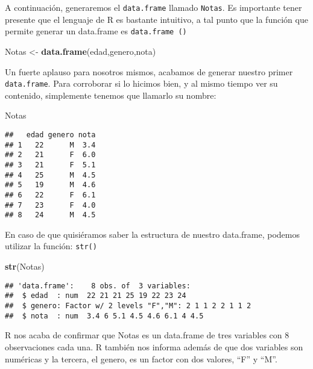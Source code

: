 \documentclass[]{book}
\newenvironment{Shaded}{\begin{snugshade}}{\end{snugshade}}
\newcommand{\KeywordTok}[1]{\textcolor[rgb]{0.13,0.29,0.53}{\textbf{#1}}}
\newcommand{\NormalTok}[1]{#1}
\newcommand{\StringTok}[1]{\textcolor[rgb]{0.31,0.60,0.02}{#1}}
\begin{document}
A continuación, generaremos el \texttt{data.frame} llamado \texttt{Notas}. Es importante tener presente que el lenguaje de R es bastante intuitivo, a tal punto que la función que permite generar un data.frame es \texttt{data.frame\ ()}

\begin{Shaded}
\begin{Highlighting}[]
\NormalTok{Notas <-}\StringTok{ }\KeywordTok{data.frame}\NormalTok{(edad,genero,nota)}
\end{Highlighting}
\end{Shaded}

Un fuerte aplauso para nosotros mismos, acabamos de generar nuestro primer \texttt{data.frame}. Para corroborar si
lo hicimos bien, y al mismo tiempo ver su contenido, simplemente tenemos que llamarlo su nombre:

\begin{Shaded}
\begin{Highlighting}[]
\NormalTok{Notas}
\end{Highlighting}
\end{Shaded}

\begin{verbatim}
##   edad genero nota
## 1   22      M  3.4
## 2   21      F  6.0
## 3   21      F  5.1
## 4   25      M  4.5
## 5   19      M  4.6
## 6   22      F  6.1
## 7   23      F  4.0
## 8   24      M  4.5
\end{verbatim}

En caso de que quisiéramos saber la estructura de nuestro data.frame, podemos utilizar la función:
\texttt{str()}

\begin{Shaded}
\begin{Highlighting}[]
\KeywordTok{str}\NormalTok{(Notas)}
\end{Highlighting}
\end{Shaded}

\begin{verbatim}
## 'data.frame':    8 obs. of  3 variables:
##  $ edad  : num  22 21 21 25 19 22 23 24
##  $ genero: Factor w/ 2 levels "F","M": 2 1 1 2 2 1 1 2
##  $ nota  : num  3.4 6 5.1 4.5 4.6 6.1 4 4.5
\end{verbatim}

R nos acaba de confirmar que Notas es un data.frame de tres variables con 8 observaciones cada una. R
también nos informa además de que dos variables son numéricas y la tercera, el genero, es un factor con dos
valores, ``F'' y ``M''.
\end{document}
